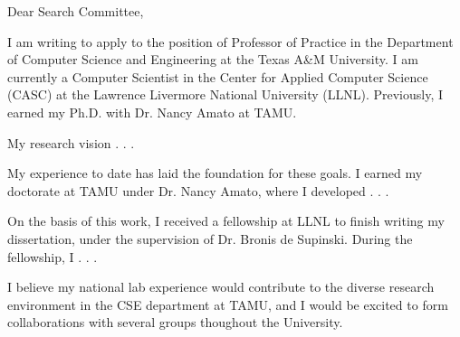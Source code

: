 \documentclass[11pt]{article}
\begin{document}
Dear Search Committee,

I am writing to apply to the position of Professor of Practice in the Department of Computer Science and Engineering at the Texas A\&M University.  I am currently a Computer Scientist in the Center for Applied Computer Science (CASC) at the Lawrence Livermore National University (LLNL).  Previously, I earned my Ph.D. with Dr. Nancy Amato at TAMU.

My research vision . . .

My experience to date has laid the foundation for these goals.  I earned my doctorate at TAMU under Dr. Nancy Amato, where I developed . . .

On the basis of this work, I received a fellowship at LLNL to finish writing my dissertation, under the supervision of Dr. Bronis de Supinski.
During the fellowship, I . . .

I believe my national lab experience would contribute to the diverse research environment in the CSE department at TAMU, and I would be excited to form collaborations with several groups thoughout the University.



\end{document}
